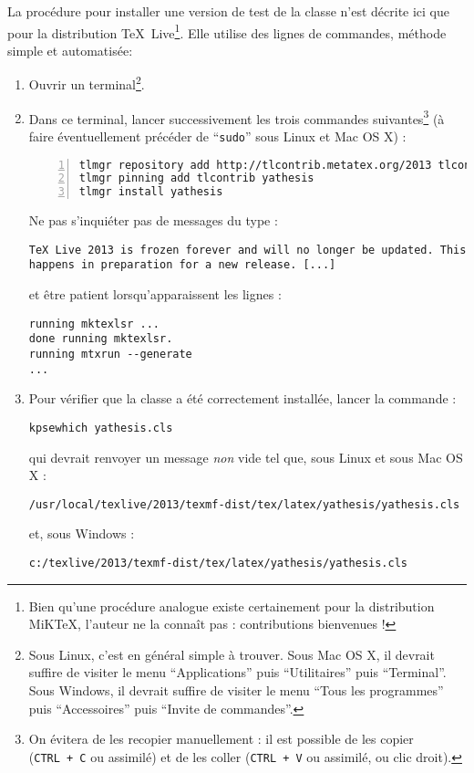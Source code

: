 La procédure pour installer une version de test de la classe n'est décrite ici
que pour la distribution \TeX~Live\footnote{Bien qu'une procédure analogue
  existe certainement pour la distribution MiK\TeX{}, l'auteur ne la connaît
  pas : contributions bienvenues !}. Elle utilise des lignes de commandes,
méthode simple et automatisée:
\begin{enumerate}
\item Ouvrir un terminal\footnote{Sous Linux, c'est en général simple
    à trouver. Sous Mac OS X, il devrait suffire de visiter le menu
    \enquote{Applications} puis \enquote{Utilitaires} puis
    \enquote{Terminal}. Sous Windows, il devrait suffire de visiter le menu
    \enquote{Tous les programmes} puis \enquote{Accessoires} puis
    \enquote{Invite de commandes}.}.
\item Dans ce terminal, lancer successivement les trois commandes
  suivantes\footnote{On évitera de les recopier manuellement : il est possible
    de les copier (\texttt{CTRL~+~C} ou assimilé) et de les coller
    (\texttt{CTRL~+~V} ou assimilé, ou clic droit).} (à faire éventuellement
  précéder de \enquote{\protect\lstinline|sudo|} sous Linux et Mac OS X) :
\begin{lstlisting}[numbers=left]
tlmgr repository add http://tlcontrib.metatex.org/2013 tlcontrib
tlmgr pinning add tlcontrib yathesis
tlmgr install yathesis
\end{lstlisting}
  Ne pas s'inquiéter pas de messages du type :
\begin{lstlisting}
TeX Live 2013 is frozen forever and will no longer be updated. This
happens in preparation for a new release. [...]
\end{lstlisting}
  et être patient lorsqu'apparaissent les lignes :
\begin{lstlisting}
running mktexlsr ...
done running mktexlsr.
running mtxrun --generate
...
\end{lstlisting}
\item Pour vérifier que la classe a été correctement installée, lancer la
  commande :
\begin{lstlisting}
kpsewhich yathesis.cls
\end{lstlisting}
  qui devrait renvoyer un message \emph{non} vide tel que, sous Linux et sous
  Mac OS X :
\begin{lstlisting}
/usr/local/texlive/2013/texmf-dist/tex/latex/yathesis/yathesis.cls
\end{lstlisting}
  et, sous Windows :
\begin{lstlisting}
c:/texlive/2013/texmf-dist/tex/latex/yathesis/yathesis.cls
\end{lstlisting}
\end{enumerate}

